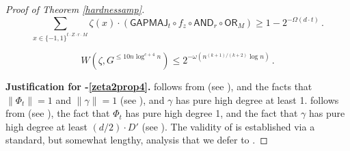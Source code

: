 \documentclass{toc}
\newcommand{\OR}{\mathsf{ OR}}
\newcommand{\GAPMAJ}{\mathsf{GAPMAJ}}
\newcommand{\bits}{\{-1,1\}}
\newcommand{\AND}{\mathsf{AND}}
\begin{document}
\begin{proof}[Proof of Theorem \ref{hardnessamp}]
	\begin{equation}\label{zeta2prop3}
	\sum_{x\in\bits^{t \cdot Z \cdot r \cdot M}} \zeta(x) \cdot \left(\GAPMAJ_t \circ f_z \circ \AND_{r} \circ \OR_M\right)  \geq 1-2^{-\Omega(d\cdot t)}\,.
	\end{equation}
	
	\begin{equation} \label{zeta2prop4}
	W(\zeta, G^{\leq 10 n \log^{c + 4} n}) \leq 2^{-\omega(n^{(k+1)/(k+2)} \log n)}\,.
	\end{equation}
	
	\medskip \noindent \textbf{Justification for -\eqref{zeta2prop4}.}
	 follows from  (see  ), and 
	the facts that $\|\Phi_t\|=1$ and $\|\gamma\|=1$ (see  ), and $\gamma$ has pure high degree at least 1.
	 follows from  (see  ), 
	the fact that $\Phi_t$ has pure high degree 1, and the fact that $\gamma$ has pure high degree at least $(d/2) \cdot D'$ (see  ).
	The validity of  is established via a standard, but somewhat lengthy, analysis that we
	defer to .
	

\end{proof}
\end{document}
